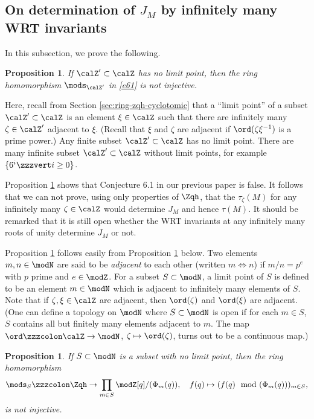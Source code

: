 \documentclass{amsart}
\numberwithin{equation}{section}
\numberwithin{figure}{section}
\theoremstyle{plain}
\newtheorem{proposition}[theorem]{Proposition}
\theoremstyle{definition}
\theoremstyle{remark}
\begin{document}
\subsection{On determination of $J_M$ by infinitely many WRT invariants}
\label{sec:determination-jm-wrt}

In this subsection, we prove the following.

\begin{proposition}
  \label{r56}
  If $\calZ'\subset \calZ$ has no limit point, then the ring homomorphism
  $\mods _{\calZ'}$ in \eqref{e61} is not injective.
\end{proposition}

Here, recall from Section \ref{sec:ring-zqh-cyclotomic} that a ``limit
point'' of a subset $\calZ'\subset \calZ$ is an element $\xi \in \calZ$ such
that there are infinitely many $\zeta \in \calZ'$ adjacent to $\xi $.  (Recall
that $\xi $ and $\zeta $ are adjacent if $\ord(\zeta \xi ^{-1})$ is a prime
power.)  Any finite subset $\calZ'\subset \calZ$ has no limit point.  There
are many infinite subset $\calZ'\subset \calZ$ without limit points, for
example $\{6^i\zzzvert i\ge 0\}$.

Proposition \ref{r56} shows that Conjecture 6.1 in our previous paper
\cite{H:cyclotomic} is false.  It follows that we can not prove, using
only properties of $\Zqh$, that the $\tau _\zeta (M)$ for any infinitely many
$\zeta \in \calZ$ would determine $J_M$ and hence $\tau (M)$.  It should be
remarked that it is still open whether the WRT invariants at any
infinitely many roots of unity determine $J_M$ or not.

Proposition \ref{r56} follows easily from Proposition \ref{r55} below.
Two elements $m,n\in \modN $ are said to be {\em adjacent} to each other
(written $m\Leftrightarrow n$) if $m/n=p^e$ with $p$ prime and $e\in \modZ $.  For a
subset $S\subset \modN $, a limit point of $S$ is defined to be an element
$m\in \modN $ which is adjacent to infinitely many elements of $S$.  Note
that if $\zeta ,\xi \in \calZ$ are adjacent, then $\ord(\zeta )$ and $\ord(\xi )$
are adjacent.  (One can define a topology on $\modN $ where $S\subset \modN $ is
open if for each $m\in S$, $S$ contains all but finitely many elements
adjacent to $m$.  The map $\ord\zzzcolon \calZ\rightarrow \modN $, $\zeta \mapsto\ord(\zeta )$,
turns out to be a continuous map.)

\begin{proposition}
  \label{r55}
  If $S\subset \modN $ is a subset with no limit point, then the ring
  homomorphism
  \begin{equation}
    \label{e8}
    \mods _S\zzzcolon \Zqh\rightarrow \prod_{m\in S}\modZ [q]/(\Phi _m(q)),\quad
    f(q)\mapsto (f(q)\mod(\Phi _m(q)))_{m\in S},
  \end{equation}
  is not injective.
\end{proposition}
\end{document}
